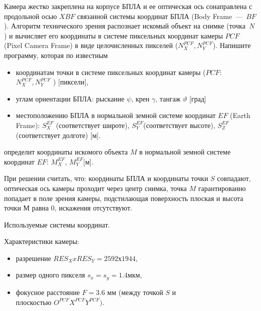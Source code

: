 
Камера жестко закреплена на корпусе БПЛА и ее оптическая ось сонаправлена с
продольной осью $XBF$ связанной системы координат БПЛА (Body Frame~—~$BF$). Алгоритм технического зрения распознает искомый объект на снимке (точка~$N$) и вычисляет его координаты в системе пиксельных
координат камеры $PCF$ (Pixel Camera Frame) в виде целочисленных пикселей ($N^{PCF}_X, N^{PCF}_Y$). 
Напишите программу, которая по известным 

\begin{itemize}
    \item координатам точки в системе пиксельных координат камеры ($PCF$: \linebreak $N^{PCF}_X, N^{PCF}_Y$ ) [пиксели],
    \item углам ориентации БПЛА: рыскание $ \psi $, крен $ \gamma $, тангаж $ \vartheta $ [град]
    \item местоположению БПЛА в нормальной земной системе координат $EF$ (Earth Frame): $S_X^{EF}$ 
    (соответствует широте), 
    $ S_Y^{EF} $(соответствует высоте), \linebreak $ S_Z^{EF} $(соответствует долготе) [м].
\end{itemize}

определит координаты искомого объекта $ M $ в нормальной земной системе координат $ EF $: $ M_X^{EF} $, $ M_Y^{EF} $[м].
 
При решении считать, что: координаты БПЛА и координаты точки $ S $ совпадают, оптическая ось 
камеры проходит через центр снимка, точка $ M $ гарантированно попадает в поле зрения камеры, 
подстилающая поверхность плоская и высота точки М равна 0, искажения отсутствуют.


\begin{center}
Используемые системы координат.
\end{center}

Характеристики камеры:

\begin{itemize}
    \item разрешение $RES_X x RES_Y = 2592 х 1944$,
    \item размер одного пикселя $s_x = s_y = 1.4 \text{мкм}$,
    \item фокусное расстояние $ F = 3.6$ мм (между точкой $S$ и \\ плоскостью $O^{PCF}X^{PCF}Y^{PCF}) $.
\end{itemize}

